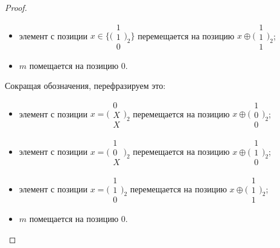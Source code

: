 \begin{proof}
\begin{itemize}
        \item элемент с позиции $x \in \{\bigl(\begin{smallmatrix}1\\1\\0
\end{smallmatrix}\bigr)_2\}$ перемещается на позицию $x \oplus \bigl(\begin{smallmatrix}1\\1\\1\end{smallmatrix}\bigr)_2$;
        \item $m$ помещается на позицию 0.
\end{itemize}

Сокращая обозначения, перефразируем это:
\begin{itemize}
    \item элемент с позиции $x = \bigl(\begin{smallmatrix}0\\X\\X\end{smallmatrix}\bigr)_2$ перемещается на позицию $x \oplus \bigl(\begin{smallmatrix}1\\0\\0 \end{smallmatrix}\bigr)_2$;
    \item элемент с позиции $x = \bigl(\begin{smallmatrix}1\\0\\X\end{smallmatrix}\bigr)_2$ перемещается на позицию $x \oplus \bigl(\begin{smallmatrix}1\\1\\0\end{smallmatrix}\bigr)_2$;
    \item элемент с позиции $x = \bigl(\begin{smallmatrix}1\\1\\0\end{smallmatrix}\bigr)_2$ перемещается на позицию $x \oplus \bigl(\begin{smallmatrix}1\\1\\1\end{smallmatrix}\bigr)_2$;
    \item $m$ помещается на позицию 0.
\end{itemize}


\end{proof}
